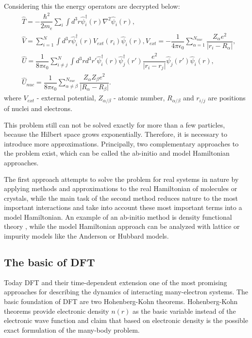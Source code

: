 Considering this the energy operators are decrypted below:
\begin{subequations}
\begin{align}
\label{H_kinetic}
&
\hat{T}=-\dfrac{\hbar^2}{2m_e}\sum_i \int d^3r \hat{\psi}^\dagger_i(r) \nabla^2 \hat{\psi}_i(r),
\\
&
\label{H_external}
\hat{V}=\sum_{i=1}^{N} \int d^3r \hat{\psi}^\dagger_i(r) V_{ext}(r_i) \hat{\psi}_i(r), V_{ext}=-\dfrac{1}{4\pi\epsilon_0}\sum_{\alpha=1}^{N_{nuc}}\dfrac{Z_\alpha e^2}{\vert r_i - R_\alpha\vert},
\\
\label{H electron}
&
\hat{U}=\dfrac{1}{8 \pi \epsilon_0} \sum_{i \neq j}^N \int d^3 r d^3 r' \hat{\psi}^\dagger_i(r)\hat{\psi}^\dagger_j(r')\dfrac{e^2}{\vert r_i-r_j \vert}\hat{\psi}_j(r')\hat{\psi}_i(r),
\\
&
\hat{U}_{nuc}=\dfrac{1}{8 \pi \epsilon_0} \sum_{\alpha \neq \beta}^{N_{nuc}}\dfrac{Z_\alpha Z_\beta e^2}{\vert R_\alpha-R_\beta \vert}.
\label{operators}
\end{align}
\end{subequations}
where $V_{ext}$ - external potential, $Z_{\alpha / \beta}$ - atomic number, $R_{\alpha / \beta}$ and $r_{i / j}$ are positions of nuclei and electrons.


This problem still can not be solved exactly for more than a few particles, because the Hilbert space grows exponentially. Therefore, it is necessary to introduce more approximations.
Principally, two complementary approaches to the problem exist, which can be called the ab-initio and model Hamiltonian approaches. 

The first approach attempts to solve the problem for
real systems in nature by applying methods and approximations to the real Hamiltonian of molecules or crystals, while the main task of the second method reduces nature to the most important interactions and take into account these most important terms into a model Hamiltonian. An example of an ab-initio method is density functional theory \citep{RevModPhys.71.1253}, while the model Hamiltonian approach can be analyzed with lattice or impurity models like the Anderson or Hubbard models.


\subsection{The basic of DFT}

Today DFT and their time-dependent extension one of the most promising approaches for describing the dynamics of interacting many-electron systems. The basic foundation of DFT \citep{RevModPhys.61.689} are two Hohenberg-Kohn theorems. Hohenberg-Kohn theorems provide electronic density $n(r)$ as the basic variable instead of the electronic wave function and claim that based on electronic density is the possible exact formulation of the many-body problem. 

